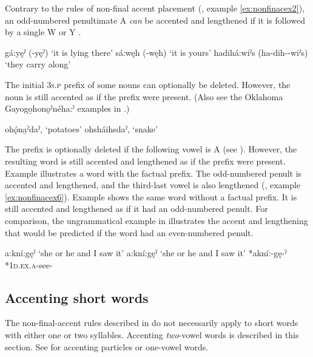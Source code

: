 Contrary to the rules of non-final accent placement (, example \ref{ex:nonfinacex2}), an odd-numbered penultimate A \emph{can} be accented and lengthened if it is followed by a single W or Y .

\ea\label{ex:nonfinacex14}
\ea gá:yęˀ (-yęˀ) ‘it is lying there’
\ex sá:węh (-węh) ‘it is yours’ 
\ex hadihá:wiˀs (ha-dih--wiˀs) ‘they carry along’
\z
\z 

The initial  \textsc{3s.p} prefix of some nouns can optionally be deleted. However, the noun is still accented as if the prefix were present. (Also see the Oklahoma Gayogo̱honǫˀnéha:ˀ examples in .)

\ea\label{ex:nonfinacex15}
\ea ohǫ́na̱ˀdaˀ,  ‘potatoes’
\ex ohsháihsdaˀ,  ‘snake’
\z
\z 

The  {\factual} prefix is optionally deleted if the following vowel is A (see ). However, the resulting word is still accented and lengthened as if the prefix were present. Example  illustrates a word with the factual prefix. The odd-numbered penult is accented and lengthened, and the third-last vowel is also lengthened (, example \ref{ex:nonfinacex6}). Example  shows the same word without a factual prefix. It is still accented and lengthened as if it had an odd-numbered penult. For comparison, the ungrammatical example in  illustrates the accent and lengthening that would be predicted if the word had an even-numbered penult. 

\ea\label{ex:nonfinacex16}
\ea {} a:kní:gęˀ ‘she or he and I saw it’ \label{ex:nonfinacex16a}
\ex {} a:kní:gęˀ ‘she or he and I saw it’ \label{ex:nonfinacex16b}
\ex {} *akní:-gę-ˀ *\textsc{1d.ex.a}-see-{\punctual} \label{ex:nonfinacex16c}
\z
\z

\subsection{Accenting short words}
The non-final-accent rules described in  do not necessarily apply to short words with either one or two syllables. Accenting \emph{two}-vowel words is described in this section. See  for accenting particles or one-vowel words. 

